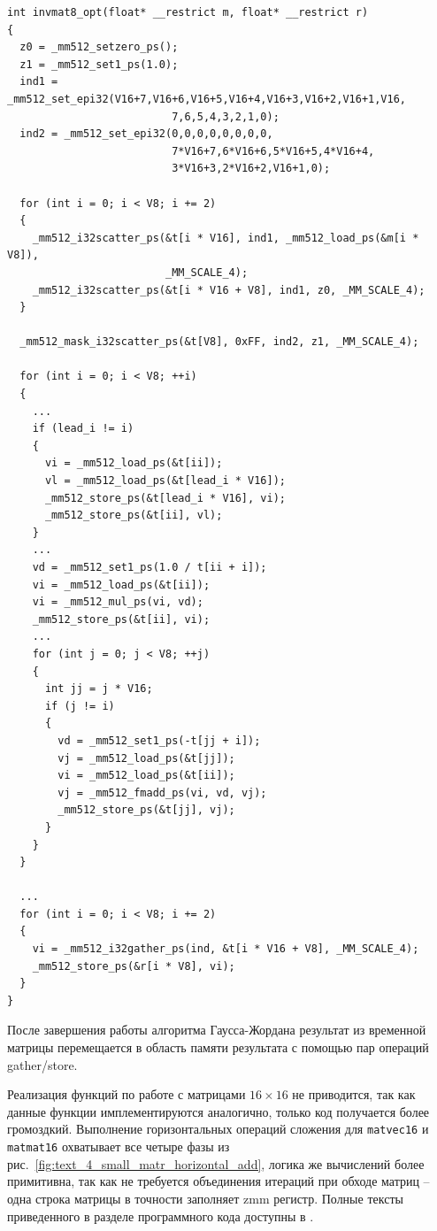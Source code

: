 \begin{singlespace}
\begin{lstlisting}[caption={Векторизованная версия вычисления обратной \\ матрицы размера $8 \times 8$.},label={lst:text_4_small_matr_invmat_opt}]
int invmat8_opt(float* __restrict m, float* __restrict r)
{
  z0 = _mm512_setzero_ps();
  z1 = _mm512_set1_ps(1.0);
  ind1 = _mm512_set_epi32(V16+7,V16+6,V16+5,V16+4,V16+3,V16+2,V16+1,V16,
                          7,6,5,4,3,2,1,0);
  ind2 = _mm512_set_epi32(0,0,0,0,0,0,0,0,
                          7*V16+7,6*V16+6,5*V16+5,4*V16+4,
                          3*V16+3,2*V16+2,V16+1,0);

  for (int i = 0; i < V8; i += 2)
  {
    _mm512_i32scatter_ps(&t[i * V16], ind1, _mm512_load_ps(&m[i * V8]),
                         _MM_SCALE_4);
    _mm512_i32scatter_ps(&t[i * V16 + V8], ind1, z0, _MM_SCALE_4);
  }

  _mm512_mask_i32scatter_ps(&t[V8], 0xFF, ind2, z1, _MM_SCALE_4);

  for (int i = 0; i < V8; ++i)
  {
    ...
    if (lead_i != i)
    {
      vi = _mm512_load_ps(&t[ii]);
      vl = _mm512_load_ps(&t[lead_i * V16]);
      _mm512_store_ps(&t[lead_i * V16], vi);
      _mm512_store_ps(&t[ii], vl);
    }
    ...
    vd = _mm512_set1_ps(1.0 / t[ii + i]);
    vi = _mm512_load_ps(&t[ii]);
    vi = _mm512_mul_ps(vi, vd);
    _mm512_store_ps(&t[ii], vi);
    ...
    for (int j = 0; j < V8; ++j)
    {
      int jj = j * V16;
      if (j != i)
      {
        vd = _mm512_set1_ps(-t[jj + i]);
        vj = _mm512_load_ps(&t[jj]);
        vi = _mm512_load_ps(&t[ii]);
        vj = _mm512_fmadd_ps(vi, vd, vj);
        _mm512_store_ps(&t[jj], vj);
      }
    }
  }

  ...
  for (int i = 0; i < V8; i += 2)
  {
    vi = _mm512_i32gather_ps(ind, &t[i * V16 + V8], _MM_SCALE_4);
    _mm512_store_ps(&r[i * V8], vi);
  }
}
\end{lstlisting}
\end{singlespace}

После завершения работы алгоритма Гаусса-Жордана результат из временной матрицы перемещается в область памяти результата с помощью пар операций gather/store.

Реализация функций по работе с матрицами $16 \times 16$ не приводится, так как данные функции имплементируются аналогично, только код получается более громоздкий.
Выполнение горизонтальных операций сложения для \texttt{matvec16} и \texttt{matmat16} охватывает все четыре фазы из рис.~\ref{fig:text_4_small_matr_horizontal_add}, логика же вычислений более примитивна, так как не требуется объединения итераций при обходе матриц -- одна строка матрицы в точности заполняет zmm регистр.
Полные тексты приведенного в разделе программного кода доступны в \cite{iparGithub}.

